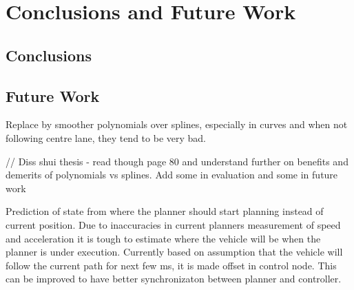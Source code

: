 \chapter{Conclusions and Future Work}
\label{conclusion}
\section{Conclusions}

\section{Future Work}
Replace by smoother polynomials over splines, especially in curves and when not following centre lane, they tend to be very bad. 

// Diss shui thesis - read though page 80 and understand further on benefits and demerits of polynomials vs splines. Add some in evaluation and some in future work


Prediction of state from where the planner should start planning instead of current position. 
Due to inaccuracies in current planners measurement of speed and acceleration it is tough to estimate where the vehicle will be when the planner is under execution. Currently based on assumption that the vehicle will follow the current path for next few ms, it is made offset in control node. This can be improved to have better synchronizaton between planner and controller. 



